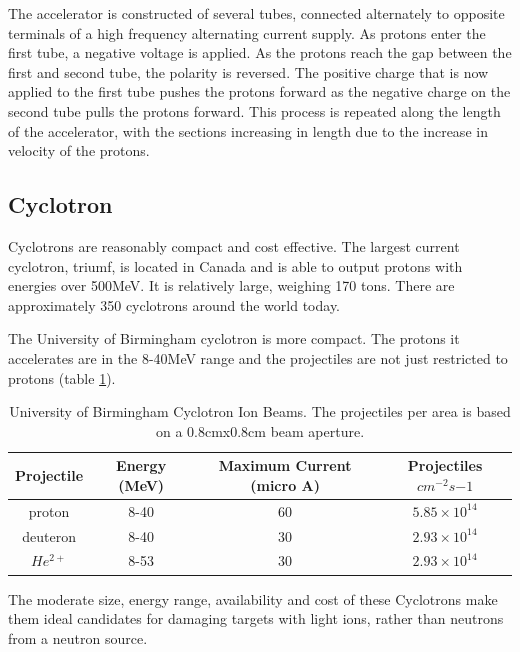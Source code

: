 The accelerator is constructed of several tubes, connected alternately to opposite terminals of a high frequency alternating current supply.  As protons enter the first tube, a negative voltage is applied.  As the protons reach the gap between the first and second tube, the polarity is reversed.  The positive charge that is now applied to the first tube pushes the protons forward as the negative charge on the second tube pulls the protons forward.  This process is repeated along the length of the accelerator, with the sections increasing in length due to the increase in velocity of the protons.




\FloatBarrier
\subsection{Cyclotron}

Cyclotrons are reasonably compact and cost effective.  The largest current cyclotron, \acrlong{triumf}, is located in Canada and is able to output protons with energies over 500MeV.  It is relatively large, weighing 170 tons.  There are approximately 350 cyclotrons\cite{cyclotrons} around the world today.

The University of Birmingham cyclotron is more compact.  The protons it accelerates are in the 8-40MeV range and the projectiles are not just restricted to protons (table \ref{table:mc40projectiles}).


\begin{table}[h]
\begin{center}
\renewcommand{\arraystretch}{1.2}
\begin{tabular}{c c c c}
\hline\hline
Projectile & Energy (MeV) & Maximum Current (micro A) & Projectiles $cm^{-2} s{-1}$\\
\hline\hline 
proton & 8-40 & 60 & $5.85 \times 10^{14}$  \\
deuteron & 8-40 & 30 & $2.93 \times 10^{14}$  \\
$He^{2+}$ & 8-53 & 30 & $2.93 \times 10^{14}$ \\
\hline\hline
\end{tabular}
\end{center}
\caption{University of Birmingham Cyclotron Ion Beams.  The projectiles per area is based on a 0.8cmx0.8cm beam aperture.}
\label{table:mc40projectiles}
\end{table}

The moderate size, energy range, availability and cost of these Cyclotrons make them ideal candidates for damaging targets with light ions, rather than neutrons from a neutron source.



